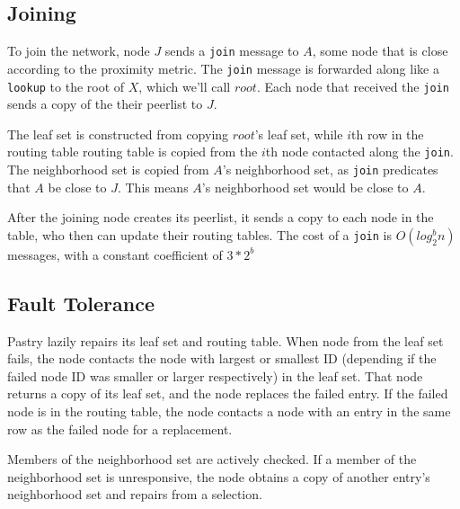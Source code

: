 \documentclass[10pt,letterpaper,twoside]{report}
\begin{document}
\subsection*{Joining}
To join the network, node $J$ sends a \texttt{join} message to $A$, some node that is close according to the proximity metric.
The \texttt{join} message is forwarded along like a \texttt{lookup} to the root of $X$, which we'll call $root$.
Each node that received the \texttt{join} sends a copy of the their peerlist to $J$.

The leaf set is constructed from copying $root$'s leaf set, while $i$th row in the routing table routing table is copied from the $i$th node contacted along the \texttt{join}.
The neighborhood set is copied from $A$'s neighborhood set, as \texttt{join} predicates that $A$ be close to $J$.
This means $A$'s neighborhood set would be close to $A$. 

After the joining node creates its peerlist, it sends a copy to each node in the table, who then can update their routing tables.  
The cost of a \texttt{join} is $O(log_{2}^{b} n)$ messages,  with  a constant  coefficient  of $3*2^{b}$




\subsection*{Fault Tolerance}
Pastry lazily repairs its leaf set and routing table.
When node from the leaf set fails, the node contacts the node with largest or smallest ID (depending if the failed node ID was smaller or larger respectively) in the leaf set.
That node returns a copy of its leaf set, and the node replaces the failed entry.
If the failed node is in the routing table, the node contacts a node with an entry in the same row as the failed node for a replacement.

Members of the neighborhood set are actively checked.
If a member of the neighborhood set is unresponsive, the node obtains a copy of another entry's neighborhood set and repairs from a selection.



\end{document}
